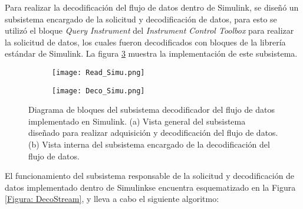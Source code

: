 Para realizar la decodificación del flujo de datos dentro de Simulink\textregistered, se diseñó un subsistema encargado de la solicitud y decodificación de datos, para esto se utilizó el bloque \emph{Query Instrument} del \emph{Instrument Control Toolbox} para realizar la solicitud de datos, los cuales fueron decodificados con bloques de la librería estándar de Simulink\textregistered. La figura \ref{Figura: DecoSimuT} muestra la implementación de este subsistema.

\hfill \break

\begin{figure}[htbp]
	\centering
	\begin{subfigure}[htbp]{0.8\textwidth}
		\texttt{[image: Read\_Simu.png]}
		\caption{}
		\label{Figura: readSimu}
	\end{subfigure}
	\begin{subfigure}[htbp]{0.75\textwidth}
		\texttt{[image: Deco\_Simu.png]}
		\caption{}
		\label{Figura: decoSimu}
	\end{subfigure}
	\caption[Diagrama de bloques del subsistema decodificador del flujo de datos]{Diagrama de bloques del subsistema decodificador del flujo de datos implementado en Simulink\textregistered . (a) Vista general del subsistema diseñado para realizar adquisición y decodificación del flujo de datos. (b) Vista interna del subsistema encargado de la decodificación del flujo de datos.}
	\label{Figura: DecoSimuT}
\end{figure}

\newpage
El funcionamiento del subsistema responsable de la solicitud y decodificación de datos implementado dentro de Simulink\textregistered se encuentra esquematizado en la Figura \ref{Figura: DecoStream}, y lleva a cabo el siguiente algoritmo:

